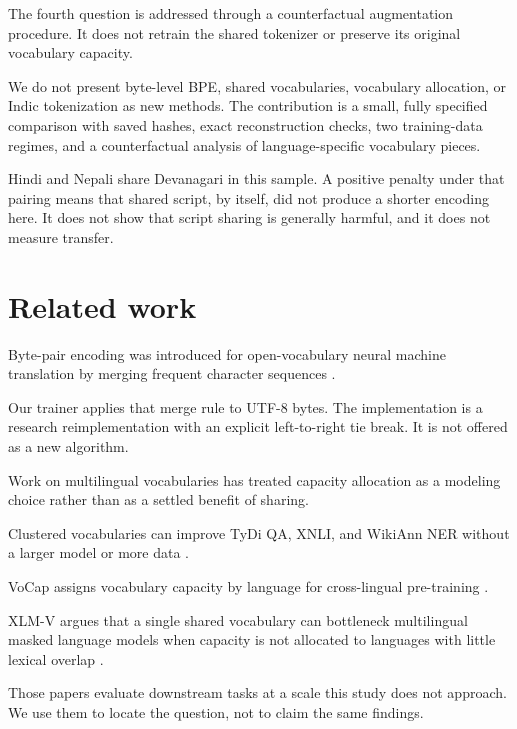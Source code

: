 \documentclass[10pt,twocolumn]{article}
\begin{document}
The fourth question is addressed through a counterfactual
augmentation procedure. It does not retrain the shared
tokenizer or preserve its original vocabulary capacity.

We do not present byte-level BPE, shared vocabularies,
vocabulary allocation, or Indic tokenization as new methods.
The contribution is a small, fully specified comparison
with saved hashes, exact reconstruction checks, two
training-data regimes, and a counterfactual analysis of
language-specific vocabulary pieces.

Hindi and Nepali share Devanagari in this sample.
A positive penalty under that pairing means that shared
script, by itself, did not produce a shorter encoding here.
It does not show that script sharing is generally harmful,
and it does not measure transfer.


\section{Related work}

Byte-pair encoding was introduced for open-vocabulary
neural machine translation by merging frequent character
sequences \citep{sennrich-etal-2016-neural}.

Our trainer applies that merge rule to UTF-8 bytes.
The implementation is a research reimplementation with
an explicit left-to-right tie break. It is not offered
as a new algorithm.

Work on multilingual vocabularies has treated capacity
allocation as a modeling choice rather than as a settled
benefit of sharing.

Clustered vocabularies can improve TyDi QA, XNLI, and
WikiAnn NER without a larger model or more data
\citep{chung-etal-2020-improving}.

VoCap assigns vocabulary capacity by language for
cross-lingual pre-training
\citep{zheng-etal-2021-allocating}.

XLM-V argues that a single shared vocabulary can bottleneck
multilingual masked language models when capacity is not
allocated to languages with little lexical overlap
\citep{liang-etal-2023-xlm}.

Those papers evaluate downstream tasks at a scale this
study does not approach. We use them to locate the question,
not to claim the same findings.
\end{document}
